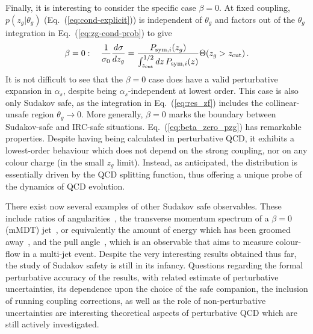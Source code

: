 Finally, it is interesting to consider the specific case $\beta=0$. At
fixed coupling, $p(z_g|\theta_g)$ (Eq.~(\ref{eq:cond-explicit})) is
independent of $\theta_g$ and factors out of the $\theta_g$
integration in Eq.~(\ref{eq:zg-cond-prob}) to give
\begin{equation}
\label{eq:beta_zero_pzg}
\beta = 0: \quad \frac{1}{\sigma_0}\frac{d \sigma}{d z_g} = \frac{P_{\text{sym},i}(z_g)}{\int_{z_\text{cut}}^{1/2} dz \, P_{\text{sym},i}(z)}\Theta(z_g>z_{\text{cut}})\,.
\end{equation}
It is not difficult to see that the $\beta = 0$ case does have a valid
perturbative expansion in $\alpha_s$, despite being
$\alpha_s$-independent at lowest order.
%
This case is also only Sudakov safe, as the integration in
Eq.~(\ref{eq:res_zf}) includes the collinear-unsafe region
$\theta_g\to 0$.
%
More generally, $\beta=0$ marks the boundary between Sudakov-safe and
IRC-safe situations.  Eq.~(\ref{eq:beta_zero_pzg}) has remarkable
properties. Despite having being calculated in perturbative QCD, it
exhibits a lowest-order behaviour which does not depend on the strong
coupling, nor on any colour charge (in the small $z_g$ limit). 
%
Instead, as anticipated, the distribution is essentially driven by the
QCD splitting function, thus offering a unique probe of the dynamics
of QCD evolution.



There exist now several examples of other Sudakov safe observables. These include ratios of angularities~\cite{Larkoski:2013paa}, the transverse momentum spectrum of a \SD $\beta=0$ (mMDT) jet~\cite{Marzani:2017mva}, or equivalently the amount of energy which has been groomed away~\cite{Larkoski:2014wba}, and the pull angle~\cite{Gallicchio:2010sw}, which is an observable that aims to measure colour-flow in a multi-jet event. 
Despite the very interesting results obtained thus far, the study of Sudakov safety is still in its infancy. 
%
Questions regarding the formal perturbative accuracy of the results,
with related estimate of perturbative uncertainties,  its dependence
upon the choice of the safe companion, the inclusion of running
coupling corrections, as well as the role of non-perturbative
uncertainties are interesting theoretical aspects of perturbative QCD
which are still actively investigated.










